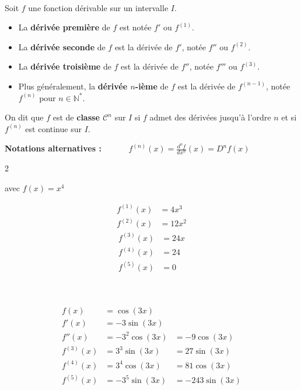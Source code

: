 \documentclass[11pt,a4paper]{article}
\newcommand{\cor}[1]{%
\begin{tcolorbox}[colback=red!5!white,colframe=red!75!black]
#1
\end{tcolorbox}
}
\begin{document}
\newpage           %

\\[5 pt]
\cor{
Soit $f$ une fonction dérivable sur un intervalle $I$.

\begin{itemize}
\item La \textbf{dérivée première} de $f$ est notée $f'$ ou $f^{(1)}$.

\item La \textbf{dérivée seconde} de $f$ est la dérivée de $f'$, notée $f''$ ou $f^{(2)}$.

\item La \textbf{dérivée troisième} de $f$ est la dérivée de $f''$, notée $f'''$ ou $f^{(3)}$.

\item Plus généralement, la \textbf{dérivée $n$-ième} de $f$ est la dérivée de $f^{(n-1)}$, notée $f^{(n)}$ pour $n \in \mathbb{N}^*$.
\end{itemize}

\vfill 

On dit que $f$ est de \textbf{classe $\mathcal{C}^n$} sur $I$ si $f$ admet des dérivées jusqu'à l'ordre $n$ et si $f^{(n)}$ est continue sur $I$.

\vfill 

\textbf{Notations alternatives :} ~~~~~~$f^{(n)}(x) = \frac{d^n f}{dx^n}(x) = D^n f(x)$
}

\vfill

\cor{
\begin{multicols}{2}

    avec $f(x)=x^4$ 
    
\begin{align*}
    f^{(1)}(x) & =4x^3 \\
    f^{(2)}(x) & =12x^2 
\end{align*}
\begin{align*}
    f^{(3)}(x) & =24x \\
    f^{(4)}(x) & =24 \\
    f^{(5)}(x) & =0 \\
\end{align*}
\end{multicols}


}

\\[5 pt]
\cor{
\begin{align*}
f(x) &= \cos(3x) & ~~\\
f'(x) &= -3\sin(3x) &  ~~\\
f''(x) &= -3^2\cos(3x) & = -9\cos(3x) \\
f^{(3)}(x) &= 3^3\sin(3x) & = 27\sin(3x) \\
f^{(4)}(x) &= 3^4\cos(3x) & = 81\cos(3x) \\
f^{(5)}(x) &= -3^5\sin(3x) & = -243\sin(3x)
\end{align*}
}
\end{document}
